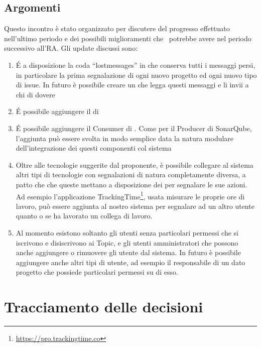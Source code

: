         \subsection{Argomenti}
            Questo incontro è stato organizzato per discutere del progresso effettuato nell'ultimo periodo e dei possibili miglioramenti che \progetto\ potrebbe avere nel periodo successivo all'RA. Gli update discussi sono:
            \begin{enumerate}
            	\item É a disposizione la coda ``lostmessages'' in  che conserva tutti i messaggi persi, in particolare la prima segnalazione di ogni nuovo progetto ed ogni nuovo tipo di issue. In futuro è possibile creare un  che legga questi messaggi e li invii a chi di dovere
            	\item É possibile aggiungere il  di 
            	\item É possibile aggiungere il Consumer di . Come per il Producer di SonarQube, l'aggiunta può essere svolta in modo semplice data la natura modulare dell’integrazione dei questi componenti col sistema
            	\item Oltre alle tecnologie suggerite dal proponente, è possibile collegare al sistema altri tipi di tecnologie con segnalazioni di natura completamente diversa, a patto che che queste mettano a disposizione dei  per segnalare le sue azioni. Ad esempio l’applicazione TrackingTime\footnote{\url{https://pro.trackingtime.co}}, usata misurare le proprie ore di lavoro, può essere aggiunta al nostro sistema per segnalare ad un altro utente quanto o se ha lavorato un collega di lavoro.
            	\item Al momento esistono soltanto gli utenti senza particolari permessi che si iscrivono e disiscrivono ai Topic, e gli utenti amministratori che possono anche aggiungere o rimuovere gli utente dal sistema. In futuro è possibile aggiungere anche altri tipi di utente, ad esempio il responsabile di un dato progetto che possiede particolari permessi su di esso.          	
            \end{enumerate}

        \section{Tracciamento delle decisioni}

